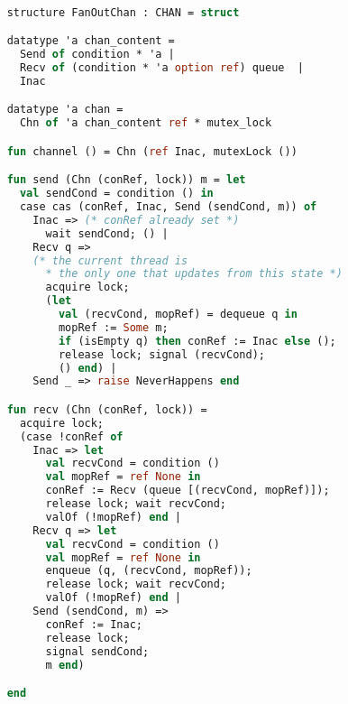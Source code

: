 \documentclass{article}
\begin{document}
  \begin{lstlisting}[language=ML, style=codestyle1]

    structure FanOutChan : CHAN = struct

    datatype 'a chan_content =
      Send of condition * 'a |
      Recv of (condition * 'a option ref) queue  |
      Inac

    datatype 'a chan =
      Chn of 'a chan_content ref * mutex_lock

    fun channel () = Chn (ref Inac, mutexLock ())

    fun send (Chn (conRef, lock)) m = let
      val sendCond = condition () in
      case cas (conRef, Inac, Send (sendCond, m)) of
        Inac => (* conRef already set *)
          wait sendCond; () |
        Recv q => 
        (* the current thread is
          * the only one that updates from this state *)
          acquire lock;
          (let
            val (recvCond, mopRef) = dequeue q in
            mopRef := Some m; 
            if (isEmpty q) then conRef := Inac else (); 
            release lock; signal (recvCond);
            () end) |
        Send _ => raise NeverHappens end

    fun recv (Chn (conRef, lock)) =
      acquire lock;
      (case !conRef of
        Inac => let
          val recvCond = condition ()
          val mopRef = ref None in
          conRef := Recv (queue [(recvCond, mopRef)]);
          release lock; wait recvCond;
          valOf (!mopRef) end |
        Recv q => let
          val recvCond = condition () 
          val mopRef = ref None in
          enqueue (q, (recvCond, mopRef));
          release lock; wait recvCond;
          valOf (!mopRef) end |
        Send (sendCond, m) =>
          conRef := Inac;
          release lock;
          signal sendCond;
          m end) 

    end 
  \end{lstlisting}
\end{document}
